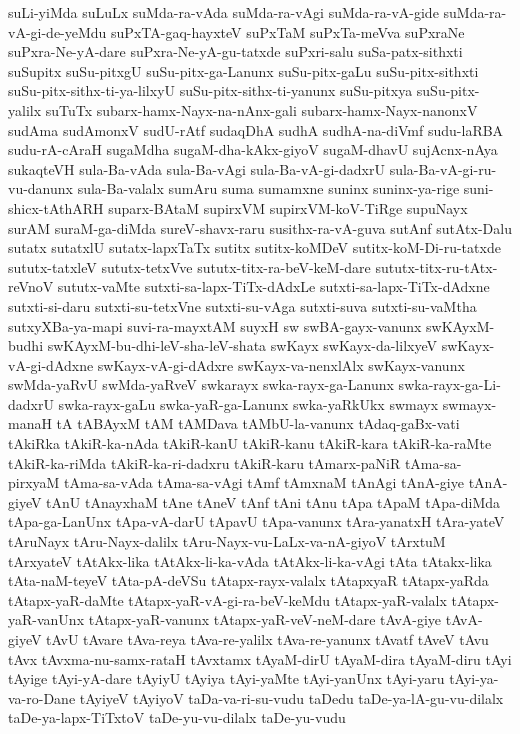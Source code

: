 {suLi-yiMda
suLuLx
suMda-ra-vAda
suMda-ra-vAgi
suMda-ra-vA-gide
suMda-ra-vA-gi-de-yeMdu
suPxTA-gaq-hayxteV
suPxTaM
suPxTa-meVva
suPxraNe
suPxra-Ne-yA-dare
suPxra-Ne-yA-gu-tatxde
suPxri-salu
suSa-patx-sithxti
suSupitx
suSu-pitxgU
suSu-pitx-ga-Lanunx
suSu-pitx-gaLu
suSu-pitx-sithxti
suSu-pitx-sithx-ti-ya-lilxyU
suSu-pitx-sithx-ti-yanunx
suSu-pitxya
suSu-pitx-yalilx
suTuTx
subarx-hamx-Nayx-na-nAnx-gali
subarx-hamx-Nayx-nanonxV
sudAma
sudAmonxV
sudU-rAtf
sudaqDhA
sudhA
sudhA-na-diVmf
sudu-laRBA
sudu-rA-cAraH
sugaMdha
sugaM-dha-kAkx-giyoV
sugaM-dhavU
sujAcnx-nAya
sukaqteVH
sula-Ba-vAda
sula-Ba-vAgi
sula-Ba-vA-gi-dadxrU
sula-Ba-vA-gi-ru-vu-danunx
sula-Ba-valalx
sumAru
suma
sumamxne
suninx
suninx-ya-rige
suni-shicx-tAthARH
suparx-BAtaM
supirxVM
supirxVM-koV-TiRge
supuNayx
surAM
suraM-ga-diMda
sureV-shavx-raru
susithx-ra-vA-guva
sutAnf
sutAtx-Dalu
sutatx
sutatxlU
sutatx-lapxTaTx
sutitx
sutitx-koMDeV
sutitx-koM-Di-ru-tatxde
sututx-tatxleV
sututx-tetxVve
sututx-titx-ra-beV-keM-dare
sututx-titx-ru-tAtx-reVnoV
sututx-vaMte
sutxti-sa-lapx-TiTx-dAdxLe
sutxti-sa-lapx-TiTx-dAdxne
sutxti-si-daru
sutxti-su-tetxVne
sutxti-su-vAga
sutxti-suva
sutxti-su-vaMtha
sutxyXBa-ya-mapi
suvi-ra-mayxtAM
suyxH
sw
swBA-gayx-vanunx
swKAyxM-budhi
swKAyxM-bu-dhi-leV-sha-leV-shata
swKayx
swKayx-da-lilxyeV
swKayx-vA-gi-dAdxne
swKayx-vA-gi-dAdxre
swKayx-va-nenxlAlx
swKayx-vanunx
swMda-yaRvU
swMda-yaRveV
swkarayx
swka-rayx-ga-Lanunx
swka-rayx-ga-Li-dadxrU
swka-rayx-gaLu
swka-yaR-ga-Lanunx
swka-yaRkUkx
swmayx
swmayx-manaH
tA
tABAyxM
tAM
tAMDava
tAMbU-la-vanunx
tAdaq-gaBx-vati
tAkiRka
tAkiR-ka-nAda
tAkiR-kanU
tAkiR-kanu
tAkiR-kara
tAkiR-ka-raMte
tAkiR-ka-riMda
tAkiR-ka-ri-dadxru
tAkiR-karu
tAmarx-paNiR
tAma-sa-pirxyaM
tAma-sa-vAda
tAma-sa-vAgi
tAmf
tAmxnaM
tAnAgi
tAnA-giye
tAnA-giyeV
tAnU
tAnayxhaM
tAne
tAneV
tAnf
tAni
tAnu
tApa
tApaM
tApa-diMda
tApa-ga-LanUnx
tApa-vA-darU
tApavU
tApa-vanunx
tAra-yanatxH
tAra-yateV
tAruNayx
tAru-Nayx-dalilx
tAru-Nayx-vu-LaLx-va-nA-giyoV
tArxtuM
tArxyateV
tAtAkx-lika
tAtAkx-li-ka-vAda
tAtAkx-li-ka-vAgi
tAta
tAtakx-lika
tAta-naM-teyeV
tAta-pA-deVSu
tAtapx-rayx-valalx
tAtapxyaR
tAtapx-yaRda
tAtapx-yaR-daMte
tAtapx-yaR-vA-gi-ra-beV-keMdu
tAtapx-yaR-valalx
tAtapx-yaR-vanUnx
tAtapx-yaR-vanunx
tAtapx-yaR-veV-neM-dare
tAvA-giye
tAvA-giyeV
tAvU
tAvare
tAva-reya
tAva-re-yalilx
tAva-re-yanunx
tAvatf
tAveV
tAvu
tAvx
tAvxma-nu-samx-rataH
tAvxtamx
tAyaM-dirU
tAyaM-dira
tAyaM-diru
tAyi
tAyige
tAyi-yA-dare
tAyiyU
tAyiya
tAyi-yaMte
tAyi-yanUnx
tAyi-yaru
tAyi-ya-va-ro-Dane
tAyiyeV
tAyiyoV
taDa-va-ri-su-vudu
taDedu
taDe-ya-lA-gu-vu-dilalx
taDe-ya-lapx-TiTxtoV
taDe-yu-vu-dilalx
taDe-yu-vudu
}
